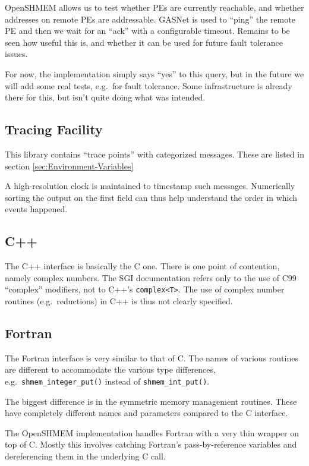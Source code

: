 \documentclass[english]{article}
\begin{document}
OpenSHMEM allows us to test whether PEs are currently reachable, and
whether addresses on remote PEs are addressable. GASNet is used to
``ping'' the remote PE and then we wait for an ``ack'' with a
configurable timeout. Remains to be seen how useful this is, and
whether it can be used for future fault tolerance issues.

For now, the implementation simply says ``yes'' to this query, but in
the future we will add some real tests, e.g.\ for fault tolerance.
Some infrastructure is already there for this, but isn't quite doing
what was intended.

\subsection{Tracing Facility}

This library contains \textquotedblleft{}trace
points\textquotedblright{} with categorized messages. These are listed
in section \ref{sec:Environment-Variables}

A high-resolution clock is maintained to timestamp such messages.
Numerically sorting the output on the first field can thus help
understand the order in which events happened.

\subsection{C++}

The C++ interface is basically the C one. There is one point of
contention, namely complex numbers. The SGI documentation refers only
to the use of C99 ``complex'' modifiers, not to C++'s
\texttt{complex<T>}.  The use of complex number routines (e.g.\
reductions) in C++ is thus not clearly specified.

\subsection{Fortran}

The Fortran interface is very similar to that of C. The names of
various routines are different to accommodate the various type
differences, e.g.\ \texttt{shmem\_integer\_put()} instead of
\texttt{shmem\_int\_put()}.

The biggest difference is in the symmetric memory management routines.
These have completely different names and parameters compared to the C
interface.

The OpenSHMEM implementation handles Fortran with a very thin wrapper
on top of C. Mostly this involves catching Fortran's pass-by-reference
variables and dereferencing them in the underlying C call.
\end{document}
